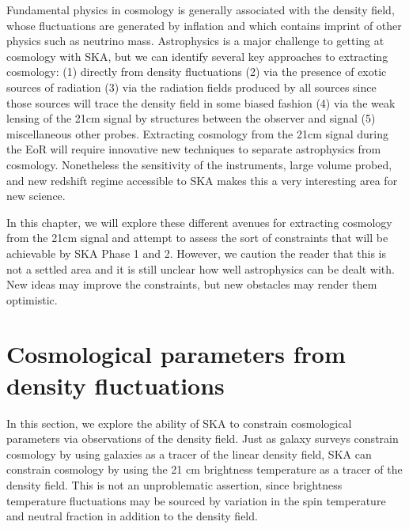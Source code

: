 \documentclass{PoS}
\begin{document}
Fundamental physics in cosmology is generally associated with the density field, whose fluctuations are generated by inflation and which contains imprint of other physics such as neutrino mass. Astrophysics is a major challenge to getting at cosmology with SKA, but we can identify several key approaches to extracting cosmology: (1) directly from density fluctuations (2) via the presence of exotic sources of radiation (3) via the radiation fields produced by all sources since those sources will trace the density field in some biased fashion (4) via the weak lensing of the 21cm signal by structures between the observer and signal (5) miscellaneous other probes. Extracting cosmology from the 21cm signal during the EoR will require innovative new techniques to separate astrophysics from cosmology. Nonetheless the sensitivity of the instruments, large volume probed, and new redshift regime accessible to SKA makes this a very interesting area for new science. 

In this chapter, we will explore these different avenues for extracting cosmology from the 21cm signal and attempt to assess the sort of constraints that will be achievable by SKA Phase 1 and 2. However, we caution the reader that this is not a settled area and it is still unclear how well astrophysics can be dealt with. New ideas may improve the constraints, but new obstacles may render them optimistic.

\section{Cosmological parameters from density fluctuations}

In this section, we explore the ability of SKA to constrain cosmological parameters via observations of the density field. Just as galaxy surveys constrain cosmology by using galaxies as a tracer of the linear density field, SKA can constrain cosmology by using the 21 cm brightness temperature as a tracer of the density field. This is not an unproblematic assertion, since brightness temperature fluctuations may be sourced by variation in the spin temperature and neutral fraction in addition to the density field. 
\end{document}
